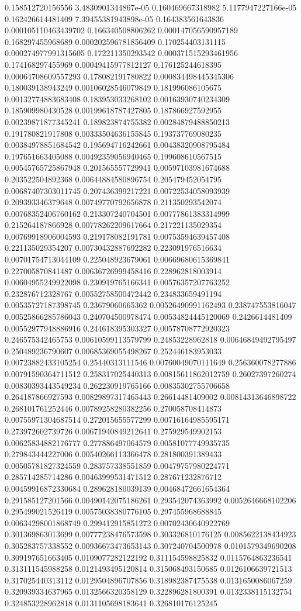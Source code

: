 \begin{table}
\begin{tabu}
\begin{sparkline}{10}
0.158512720156556 3.4830901344867e-05 0.160469667318982 5.1177947227166e-05 0.162426614481409 7.39455381943898e-05 0.164383561643836 0.000105110463439702 0.166340508806262 0.000147056590957189 0.168297455968689 0.000202596781856409 0.170254403131115 0.000274977991315605 0.172211350293542 0.000371515293461956 0.174168297455969 0.00049415977812127 0.176125244618395 0.00064708609557293 0.178082191780822 0.000834498445345306 0.180039138943249 0.00106028546079849 0.181996086105675 0.00132774883683408 0.183953033268102 0.00163930740234309 0.185909980430528 0.00199618787427805 0.187866927592955 0.00239871877345241 0.189823874755382 0.00284879488850213 0.191780821917808 0.00333504636155845 0.193737769080235 0.00384978851684542 0.195694716242661 0.00438320908795484 0.197651663405088 0.00492359056940465 0.199608610567515 0.00545765725867948 0.201565557729941 0.00597103981674688 0.203522504892368 0.00644884580896754 0.205479452054795 0.00687407303011745 0.207436399217221 0.00722534058093939 0.209393346379648 0.00749770792656878 0.211350293542074 0.00768352406760162 0.213307240704501 0.00777861383314999 0.215264187866928 0.00778262209617664 0.217221135029354 0.00769918906004593 0.219178082191781 0.00753594639457408 0.221135029354207 0.00730432887692282 0.223091976516634 0.00701754713044109 0.225048923679061 0.00669680615369841 0.227005870841487 0.00636726999458416 0.228962818003914 0.00604955249922098 0.230919765166341 0.00576357207763252 0.232876712328767 0.00552758500472442 0.234833659491194 0.00535727187398745 0.23679060665362 0.00526490991162493 0.238747553816047 0.00525866285786043 0.240704500978474 0.00534824445120069 0.2426614481409 0.00552977948886916 0.244618395303327 0.00578708772920323 0.246575342465753 0.00610599113579799 0.24853228962818 0.00646849492795497 0.250489236790607 0.00685369055498267 0.252446183953033 0.00723882433105254 0.25440313111546 0.00760049070111649 0.256360078277886 0.00791590364711512 0.258317025440313 0.00815611862012759 0.26027397260274 0.00830393443549234 0.262230919765166 0.00835302755706658 0.264187866927593 0.00829897317465443 0.26614481409002 0.00814313646898722 0.268101761252446 0.00789258280382256 0.270058708414873 0.00755971304687514 0.272015655577299 0.00716164985595171 0.273972602739726 0.00671940849212641 0.275929549902153 0.00625834882176777 0.277886497064579 0.00581077749935735 0.279843444227006 0.00540266113366478 0.281800391389433 0.00505781827324559 0.283757338551859 0.00479757980224771 0.285714285714286 0.00463999531471512 0.287671232876712 0.00459916872330684 0.289628180039139 0.00468472661654364 0.291585127201566 0.00490142075186261 0.293542074363992 0.0052646668102206 0.295499021526419 0.00575038380776105 0.297455968688845 0.00634298001868749 0.299412915851272 0.00702430640922769 0.301369863013699 0.00777238476573598 0.303326810176125 0.0085622138434923 0.305283757338552 0.00936673473653143 0.307240704500978 0.0101579349690208 0.309197651663405 0.0109077282122192 0.311154598825832 0.0115764863236541 0.313111545988258 0.0121493495120814 0.315068493150685 0.0126106639721513 0.317025440313112 0.0129504896707856 0.318982387475538 0.0131650086067259 0.320939334637965 0.0132566320358129 0.322896281800391 0.0132338115132754 0.324853228962818 0.0131105698183641 0.326810176125245 
\end{sparkline}
\end{tabu}
\end{table}
